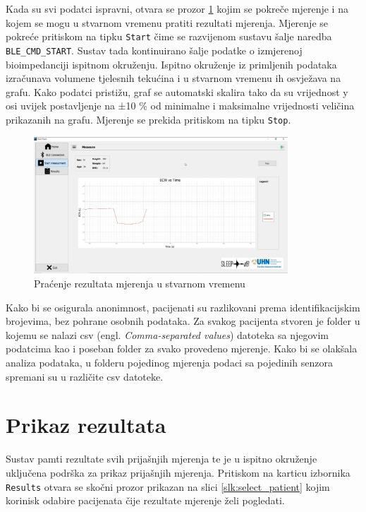 \documentclass[../diplomski_rad.tex]{subfiles}
\begin{document}
Kada su svi podatci ispravni, otvara se prozor \ref{slk:measure} kojim se pokreče mjerenje i na kojem 
se mogu u stvarnom vremenu pratiti rezultati mjerenja. 
Mjerenje se pokreće pritiskom na tipku \texttt{Start} čime se razvijenom sustavu šalje naredba \texttt{BLE\_CMD\_START}. 
Sustav tada kontinuirano šalje podatke o izmjerenoj bioimpedanciji ispitnom okruženju. 
Ispitno okruženje iz primljenih podataka izračunava volumene tjelesnih tekućina i u stvarnom vremenu ih osvježava na grafu. 
Kako podatci pristižu, graf se automatski skalira tako da su vrijednost y osi uvijek postavljenje na ±10 \% 
od minimalne i maksimalne vrijednosti veličina prikazanih na grafu.   
Mjerenje se prekida pritiskom na tipku \texttt{Stop}.

\begin{figure}[htb]
    \centering
    \includegraphics[width=0.85\textwidth]{Figures/measure.png} 
    \caption{Praćenje rezultata mjerenja u stvarnom vremenu}
    \label{slk:measure}
\end{figure}

Kako bi se osigurala anonimnost, pacijenati su razlikovani prema identifikacijskim brojevima, bez pohrane osobnih podataka. 
Za svakog pacijenta stvoren je folder u kojemu se nalazi csv (engl. \textit{Comma-separated values}) datoteka sa njegovim 
podatcima kao i poseban folder za svako provedeno mjerenje. 
Kako bi se olakšala analiza podataka, u folderu pojedinog mjerenja podaci sa pojedinih senzora spremani su u različite csv datoteke. 

\section{Prikaz rezultata}

Sustav pamti rezultate svih prijašnjih mjerenja te je u ispitno okruženje uključena podrška za prikaz prijašnjih mjerenja. 
Pritiskom na karticu izbornika \texttt{Results} otvara se skočni prozor prikazan na slici \ref{slk:select_patient} kojim korinisk odabire pacijenata 
čije rezultate mjerenje želi pogledati.
\end{document}

